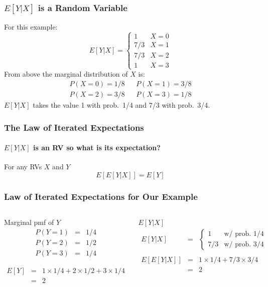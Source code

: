 \documentclass[handout]{beamer}
\begin{document}
\begin{frame}
\frametitle{$E[Y|X]$ is a Random Variable}
For this example:
	$$E[Y|X]= \left\{\begin{array}{cc}  
	1& X = 0\\
	7/3& X = 1\\
	7/3& X = 2\\ 
	1& X = 3 
	\end{array}\right.$$ 
From above the marginal distribution of $X$ is:
	\begin{eqnarray*}
		P(X=0)= 1/8 && P(X=1) = 3/8\\
		P(X=2)=3/8 && P(X=3)=1/8
	\end{eqnarray*} 
\alert{$E[Y|X]$ takes the value 1 with prob.\ 1/4 and 7/3 with prob.\ 3/4.}

\end{frame}
\begin{frame}
\frametitle{The Law of Iterated Expectations}
\framesubtitle{$E[Y|X]$ is an RV so what is its expectation?}
For any RVs $X$ and $Y$
	$$\boxed{E\left[E\left[Y|X  \right]  \right] = E[Y]}$$


\end{frame}
\begin{frame}[t]
\frametitle{Law of Iterated Expectations for Our Example}

\begin{columns}
\footnotesize
{}
\begin{block}{Marginal pmf of $Y$}
\begin{eqnarray*}
	P(Y = 1) &=& 1/4 \\
	P(Y = 2) &=& 1/2\\
	P(Y = 3) &=& 1/4
\end{eqnarray*}


\begin{eqnarray*}
	E[Y] &=& 1\times 1/4 + 2 \times 1/2 + 3 \times 1/4\\
		&=&2
\end{eqnarray*}
\end{block}

\begin{block}{$E[Y|X]$}
	\begin{eqnarray*}
	 E[Y|X] &=& \left\{\begin{array}{cc} 1& \mbox{w/ prob. } 1/4\\ 7/3& \mbox{w/ prob. } 3/4\end{array}\right.\\\\ 
	 E\left[E\left[Y|X \right] \right] &=& 1 \times 1/4 + 7/3 \times 3/4\\ 
	 &=& 2
	\end{eqnarray*}
	\vspace{1em}
\end{block}

\end{columns}

\end{frame}
\end{document}
